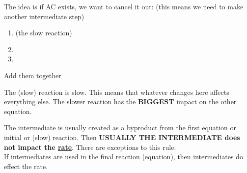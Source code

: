 \documentclass{article}
\begin{document}
The idea is if AC exists, we want to cancel it out: (this means we need to make another intermediate step)

\begin{enumerate}
\item {} (the slow reaction)
\item {} 
\item {}
\end{enumerate}
Add them together\\

The (slow) reaction is slow. This means that whatever changes here affects everything else. The slower reaction has the \textbf{BIGGEST} impact on the other equation. 

The intermediate is usually created as a byproduct from the first equation or initial or (slow) reaction. Then \textbf{USUALLY THE INTERMEDIATE does not impact the \underline{rate}}. There are exceptions to this rule.\\
If intermediates are used in the final reaction (equation), then intermediates do effect the rate.
\end{document}
